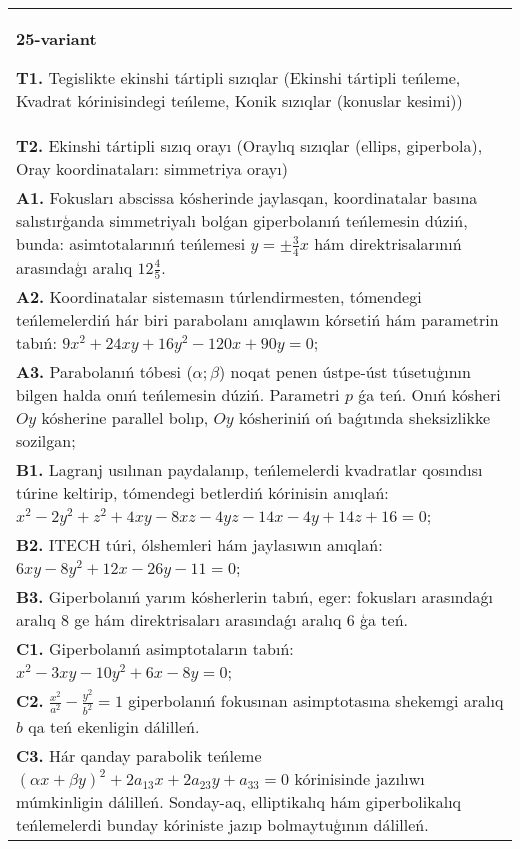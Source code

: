 \documentclass{article}
\begin{document}
\begin{tabular}{m{17cm}}
\textbf{25-variant}
\newline

\textbf{T1.} Tegislikte ekinshi tártipli sızıqlar (Ekinshi tártipli teńleme, Kvadrat kórinisindegi teńleme, Konik sızıqlar (konuslar kesimi)) \\
\textbf{T2.} Ekinshi tártipli sızıq orayı (Oraylıq sızıqlar (ellips, giperbola), Oray koordinataları: simmetriya orayı) \\
\textbf{A1.} Fokusları abscissa kósherinde jaylasqan, koordinatalar basına salıstırģanda simmetriyalı bolǵan giperbolanıń teńlemesin dúziń, bunda: asimtotalarınıń teńlemesi $y= \pm \frac{3}{4} x$ hám direktrisalarınıń arasındaģı aralıq $12 \frac{4}{5}$. \\
\textbf{A2.} Koordinatalar sistemasın túrlendirmesten, tómendegi teńlemelerdiń hár biri parabolanı anıqlawın kórsetiń hám parametrin tabıń: $9 x^2+24 x y+16 y^2-120 x+90 y=0$; \\
\textbf{A3.} Parabolanıń tóbesi ($\alpha;\beta$) noqat penen ústpe-úst túsetuģının bilgen halda onıń teńlemesin dúziń. Parametri $p$ ǵa teń. Onıń kósheri $O y$ kósherine parallel bolıp, $O y$ kósheriniń oń baǵıtında sheksizlikke sozilgan; \\
\textbf{B1.} Lagranj usılınan paydalanıp, teńlemelerdi kvadratlar qosındısı túrine keltirip, tómendegi betlerdiń kórinisin anıqlań: $x^2-2 y^2+z^2+4 x y-8 x z-4 y z-14 x-4 y+14 z+16=0$; \\
\textbf{B2.} ITECH túri, ólshemleri hám jaylasıwın anıqlań: $6 x y-8 y^2+12 x-26 y-11=0$; \\
\textbf{B3.} Giperbolanıń yarım kósherlerin tabıń, eger: fokusları arasındaǵı aralıq 8 ge hám direktrisaları arasındaǵı aralıq 6 ģa teń. \\
\textbf{C1.} Giperbolanıń asimptotaların tabıń: $x^2-3 x y-10 y^2+6 x-8 y=0$; \\
\textbf{C2.} $\frac{x^2}{a^2}-\frac{y^2}{b^2}=1$ giperbolanıń fokusınan asimptotasına shekemgi aralıq $b$ qa teń ekenligin dálilleń. \\
\textbf{C3.} Hár qanday parabolik teńleme $ (\alpha x+\beta y) ^2+2a_{13}x+2a_{23}y+a_{33}=0$ kórinisinde jazılıwı múmkinligin dálilleń. Sonday-aq, elliptikalıq hám giperbolikalıq teńlemelerdi bunday kóriniste jazıp bolmaytuģının dálilleń. \\

\end{tabular}
\vspace{1cm}
\end{document}
